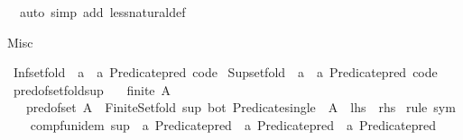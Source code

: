 \begin{isabellebody}
\ \ {\isacharparenleft}{\kern0pt}auto\ simp\ add{\isacharcolon}{\kern0pt}\ less{\isacharunderscore}{\kern0pt}natural{\isacharunderscore}{\kern0pt}def{\isacharparenright}{\kern0pt}%
\endisatagproof
{\isafoldproof}%
%
\isadelimproof
%
\endisadelimproof
%
\begin{isamarkuptext}%
Misc%
\end{isamarkuptext}\isamarkuptrue%
\isamarkupfalse%
\ Inf{\isacharunderscore}{\kern0pt}set{\isacharunderscore}{\kern0pt}fold\ {\isacharbrackleft}{\kern0pt}\ {\isacharprime}{\kern0pt}a\ {\isacharequal}{\kern0pt}\ {\isachardoublequoteopen}{\isacharprime}{\kern0pt}a\ Predicate{\isachardot}{\kern0pt}pred{\isachardoublequoteclose}{\isacharcomma}{\kern0pt}\ code{\isacharbrackright}{\kern0pt}\isanewline
{}\isamarkupfalse%
\ Sup{\isacharunderscore}{\kern0pt}set{\isacharunderscore}{\kern0pt}fold\ {\isacharbrackleft}{\kern0pt}\ {\isacharprime}{\kern0pt}a\ {\isacharequal}{\kern0pt}\ {\isachardoublequoteopen}{\isacharprime}{\kern0pt}a\ Predicate{\isachardot}{\kern0pt}pred{\isachardoublequoteclose}{\isacharcomma}{\kern0pt}\ code{\isacharbrackright}{\kern0pt}\isanewline
\isanewline
\isanewline
\isanewline
{}\isamarkupfalse%
\ pred{\isacharunderscore}{\kern0pt}of{\isacharunderscore}{\kern0pt}set{\isacharunderscore}{\kern0pt}fold{\isacharunderscore}{\kern0pt}sup{\isacharcolon}{\kern0pt}\isanewline
\ \ \ {\isachardoublequoteopen}finite\ A{\isachardoublequoteclose}\isanewline
\ \ \ {\isachardoublequoteopen}pred{\isacharunderscore}{\kern0pt}of{\isacharunderscore}{\kern0pt}set\ A\ {\isacharequal}{\kern0pt}\ Finite{\isacharunderscore}{\kern0pt}Set{\isachardot}{\kern0pt}fold\ sup\ bot\ {\isacharparenleft}{\kern0pt}Predicate{\isachardot}{\kern0pt}single\ {\isacharbackquote}{\kern0pt}\ A{\isacharparenright}{\kern0pt}{\isachardoublequoteclose}\ {\isacharparenleft}{\kern0pt}\ {\isachardoublequoteopen}{\isacharquery}{\kern0pt}lhs\ {\isacharequal}{\kern0pt}\ {\isacharquery}{\kern0pt}rhs{\isachardoublequoteclose}{\isacharparenright}{\kern0pt}\isanewline
%
\isadelimproof
%
\endisadelimproof
%
\isatagproof
{}\isamarkupfalse%
\ {\isacharparenleft}{\kern0pt}rule\ sym{\isacharparenright}{\kern0pt}\isanewline
\ \ \isamarkupfalse%
\ comp{\isacharunderscore}{\kern0pt}fun{\isacharunderscore}{\kern0pt}idem\ {\isachardoublequoteopen}sup\ {\isacharcolon}{\kern0pt}{\isacharcolon}{\kern0pt}\ {\isacharprime}{\kern0pt}a\ Predicate{\isachardot}{\kern0pt}pred\ {\isasymRightarrow}\ {\isacharprime}{\kern0pt}a\ Predicate{\isachardot}{\kern0pt}pred\ {\isasymRightarrow}\ {\isacharprime}{\kern0pt}a\ Predicate{\isachardot}{\kern0pt}pred{\isachardoublequoteclose}\isanewline

\end{isabellebody}
